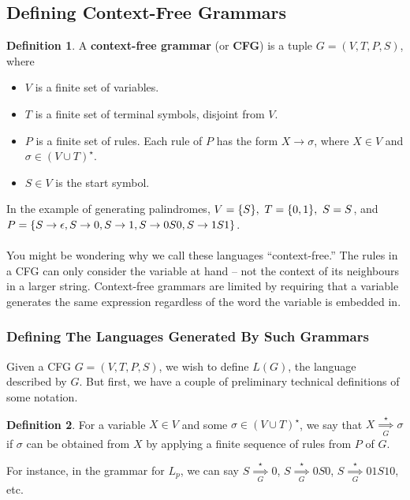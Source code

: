 \documentclass[]{article}
\DeclarePairedDelimiter{\set}{\lbrace}{\rbrace}
\theoremstyle{definition}
\newtheorem*{defn}{Definition}
\begin{document}
    \subsection{Defining Context-Free Grammars}
      \begin{defn}
        A \textbf{context-free grammar} (or \textbf{CFG}) is a tuple $G = (V, T, P, S)$, where
        \begin{itemize}
          \item $V$ is a finite set of variables.
          \item $T$ is a finite set of terminal symbols, disjoint from $V$.
          \item $P$ is a finite set of rules. Each rule of $P$ has the form $X \to \sigma$, where $X \in V$ and $\sigma \in (V \cup T)^\star$.
          \item $S \in V$ is the start symbol.
        \end{itemize}
      \end{defn}

      In the example of generating palindromes, $V = \set{S},~ T = \set{0, 1},~ S = S$, and $P = \set{S \to \epsilon, S \to 0, S \to 1, S \to 0S0, S \to 1S1 }$.
      \\ \\
      You might be wondering why we call these languages ``context-free.'' The rules in a CFG can only consider the variable at hand -- not the context of its neighbours in a larger string. Context-free grammars are limited by requiring that a variable generates the same expression regardless of the word the variable is embedded in.

      \subsubsection{Defining The Languages Generated By Such Grammars}
        Given a CFG $G = (V, T, P, S)$, we wish to define $L(G)$, the language described by $G$. But first, we have a couple of preliminary technical definitions of some notation.

        \begin{defn}
          For a variable $X \in V$ and some $\sigma \in (V \cup T)^\star$, we say that $X \underset{G}{\overset{\star}{\implies}} \sigma$ if $\sigma$ can be obtained from $X$ by applying a finite sequence of rules from $P$ of $G$.
        \end{defn}

        For instance, in the grammar for $L_p$, we can say $S \underset{G}{\overset{\star}{\implies}} 0$, $S \underset{G}{\overset{\star}{\implies}} 0S0$, $S \underset{G}{\overset{\star}{\implies}} 01S10$, etc.
\end{document}
